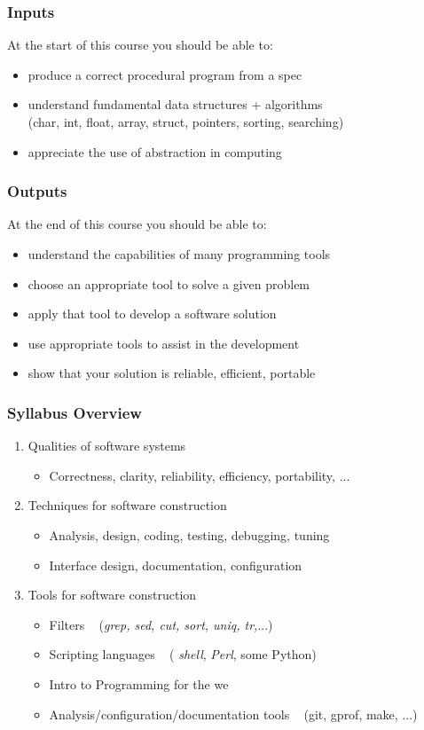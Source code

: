 \begin{frame}
\frametitle{Inputs}
At the start of this course you should be able to:
\begin{itemize}
\item  produce a correct procedural program from a spec
\item  understand fundamental data structures + algorithms \\
	{\small (char, int, float, array, struct, pointers, sorting, searching)}
\item  appreciate the use of abstraction in computing
\end{itemize}
\end{frame}

\begin{frame}
\frametitle{Outputs}
At the end of this course you should be able to:
\begin{itemize}
\item  understand the capabilities of many programming tools
\item  choose an appropriate tool to solve a given problem
\item  apply that tool to develop a software solution
\item  use appropriate tools to assist in the development 
\item  show that your solution is reliable, efficient, portable
\end{itemize}
\end{frame}

\begin{frame}[shrink]
\frametitle{Syllabus Overview}
\begin{enumerate}
\item  Qualities of software systems
{\small 
\begin{itemize}
\item  Correctness, clarity, reliability, efficiency, portability, ...
\end{itemize}
}
\item  Techniques for software construction
{\small 
\begin{itemize}
\item  Analysis, design, coding, testing, debugging, tuning
\item  Interface design, documentation, configuration
\end{itemize}
}
\item  Tools for software construction
{\small 
\begin{itemize}
\item  Filters ~ ({\em{grep, sed, cut, sort, uniq, tr,}}...)
\item  Scripting languages ~ ( {\em{shell}}, {\em{Perl}}, some Python)
\item  Intro to Programming for the we
\item  Analysis/configuration/documentation tools ~ (git, gprof, make, ...)
\end{itemize}
}
\end{enumerate}
\end{frame}

